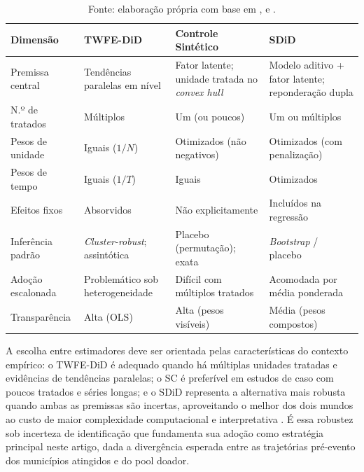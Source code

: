 \documentclass[a4paper,12pt]{article}
\begin{document}
\begin{table}[htbp]
\centering
\caption{Comparação entre os Estimadores TWFE-DiD, SC e SDiD}
\label{tab:comparacao}
\footnotesize
\begin{tabular}{p{2.5cm} p{3.2cm} p{3.2cm} p{3.2cm}}
\toprule
\textbf{Dimensão} & \textbf{TWFE-DiD} & \textbf{Controle Sintético} & \textbf{SDiD} \\
\midrule
Premissa central & Tendências paralelas em nível &
  Fator latente; unidade tratada no \textit{convex hull} &
  Modelo aditivo + fator latente; reponderação dupla \\[4pt]
N.º de tratados & Múltiplos & Um (ou poucos) & Um ou múltiplos \\[4pt]
Pesos de unidade & Iguais ($1/N$) & Otimizados (não negativos) &
  Otimizados (com penalização) \\[4pt]
Pesos de tempo & Iguais ($1/T$) & Iguais & Otimizados \\[4pt]
Efeitos fixos & Absorvidos & Não explicitamente & Incluídos na regressão \\[4pt]
Inferência padrão & \textit{Cluster-robust}; assintótica &
  Placebo (permutação); exata & \textit{Bootstrap} / placebo \\[4pt]
Adoção escalonada & Problemático sob heterogeneidade &
  Difícil com múltiplos tratados & Acomodada por média ponderada \\[4pt]
Transparência & Alta (OLS) & Alta (pesos visíveis) & Média (pesos compostos) \\
\bottomrule
\end{tabular}
\caption*{\footnotesize Fonte: elaboração própria com base em ,
 e .}
\end{table}

A escolha entre estimadores deve ser orientada pelas características do contexto empírico:
o TWFE-DiD é adequado quando há múltiplas unidades tratadas e evidências de tendências
paralelas; o SC é preferível em estudos de caso com poucos tratados e séries longas; e o
SDiD representa a alternativa mais robusta quando ambas as premissas são incertas,
aproveitando o melhor dos dois mundos ao custo de maior complexidade computacional e
interpretativa \cite{arkhangelsky2021}. É essa robustez sob incerteza de identificação que
fundamenta sua adoção como estratégia principal neste artigo, dada a divergência esperada
entre as trajetórias pré-evento dos municípios atingidos e do pool doador.


\end{document}
